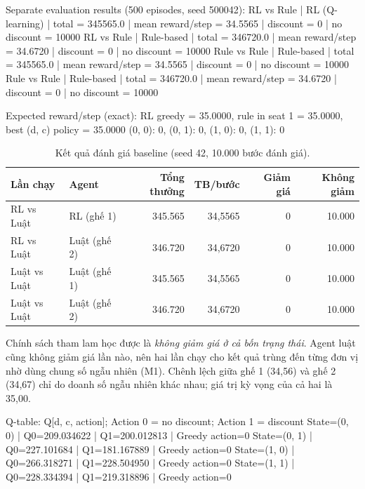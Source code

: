 \documentclass[12pt,a4paper]{report}
\begin{document}
\begin{Output}
Separate evaluation results (500 episodes, seed 500042):
RL vs Rule    | RL (Q-learning)  | total =  345565.0 | mean reward/step = 34.5565 | discount =     0 | no discount = 10000
RL vs Rule    | Rule-based       | total =  346720.0 | mean reward/step = 34.6720 | discount =     0 | no discount = 10000
Rule vs Rule  | Rule-based       | total =  345565.0 | mean reward/step = 34.5565 | discount =     0 | no discount = 10000
Rule vs Rule  | Rule-based       | total =  346720.0 | mean reward/step = 34.6720 | discount =     0 | no discount = 10000

Expected reward/step (exact): RL greedy = 35.0000, rule in seat 1 = 35.0000,
best (d, c) policy = 35.0000 {(0, 0): 0, (0, 1): 0, (1, 0): 0, (1, 1): 0}
\end{Output}

\begin{table}[H]
\centering
\small
\caption{Kết quả đánh giá baseline (seed 42, 10.000 bước đánh giá).}
\label{tab:baseline}
\begin{tabular}{llrrrr}
\toprule
Lần chạy & Agent & Tổng thưởng & TB/bước & Giảm giá & Không giảm \\
\midrule
RL vs Luật & RL (ghế 1) & 345.565 & 34{,}5565 & 0 & 10.000 \\
RL vs Luật & Luật (ghế 2) & 346.720 & 34{,}6720 & 0 & 10.000 \\
Luật vs Luật & Luật (ghế 1) & 345.565 & 34{,}5565 & 0 & 10.000 \\
Luật vs Luật & Luật (ghế 2) & 346.720 & 34{,}6720 & 0 & 10.000 \\
\bottomrule
\end{tabular}
\end{table}

Chính sách tham lam học được là \emph{không giảm giá ở cả bốn trạng thái}. Agent
luật cũng không giảm giá lần nào, nên hai lần chạy cho kết quả trùng đến từng đơn vị
nhờ dùng chung số ngẫu nhiên (M1). Chênh lệch giữa ghế 1 (34{,}56) và ghế 2 (34{,}67)
chỉ do doanh số ngẫu nhiên khác nhau; giá trị kỳ vọng của cả hai là 35{,}00.

\begin{Output}
Q-table: Q[d, c, action]; Action 0 = no discount; Action 1 = discount
State=(0, 0) | Q0=209.034622 | Q1=200.012813 | Greedy action=0
State=(0, 1) | Q0=227.101684 | Q1=181.167889 | Greedy action=0
State=(1, 0) | Q0=266.318271 | Q1=228.504950 | Greedy action=0
State=(1, 1) | Q0=228.334394 | Q1=219.318896 | Greedy action=0
\end{Output}
\end{document}
